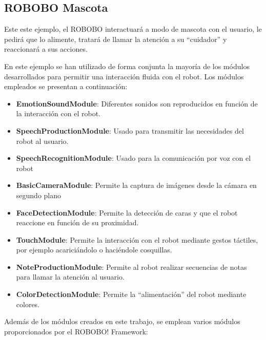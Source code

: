 \newpage

\subsection{ROBOBO Mascota}
\label{subsec:robobo-mascota}
Este este ejemplo, el ROBOBO interactuará a modo de mascota con el usuario, le pedirá que lo alimente, tratará de llamar la atención a su \enquote{cuidador} y reaccionará a sus acciones. 

En este ejemplo se han utilizado de forma conjunta la mayoría de los módulos desarrollados para permitir una interacción fluida con el robot. Los módulos empleados se presentan a continuación:




\begin{itemize}
	\item \textbf{EmotionSoundModule}: Diferentes sonidos son reproducidos en función de la interacción con el robot.
	\item \textbf{SpeechProductionModule}: Usado para transmitir las necesidades del robot al usuario.
	\item \textbf{SpeechRecognitionModule}: Usado para la comunicación por voz con el robot
	\item \textbf{BasicCameraModule}: Permite la captura de imágenes desde la cámara en segundo plano
	\item \textbf{FaceDetectionModule}: Permite la detección de caras y que el robot reaccione en función de su proximidad.
	\item \textbf{TouchModule}: Permite la interacción con el robot mediante gestos táctiles, por ejemplo acariciándolo o haciéndole cosquillas.
	\item \textbf{NoteProductionModule}: Permite al robot realizar secuencias de notas para llamar la atención al usuario.
	\item \textbf{ColorDetectionModule}: Permite la \enquote{alimentación} del robot mediante colores.
	\end{itemize}

Además de los módulos creados en este trabajo, se emplean varios módulos proporcionados por el ROBOBO! Framework:

